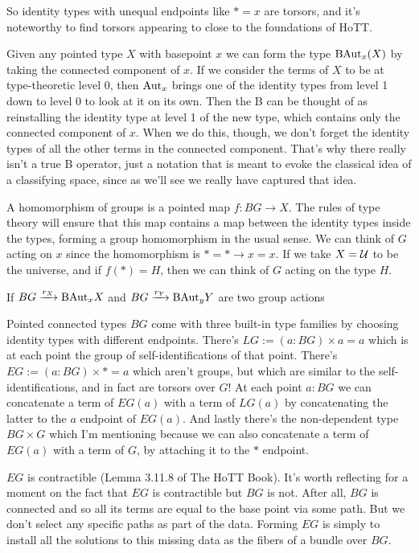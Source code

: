 \documentclass[12pt]{report}
\begin{document}
So identity types with unequal endpoints like $*=x$ are torsors, and it's noteworthy to find torsors appearing to close to the foundations of HoTT.

Given any pointed type $X$ with basepoint $x$ we can form the type $\mathrm{BAut}_x(X)$ by taking the connected component of $x$. If we consider the terms of $X$ to be at type-theoretic level 0, then $\mathrm{Aut}_x$ brings one of the identity types from level 1 down to level 0 to look at it on its own. Then the B can be thought of as reinstalling the identity type at level 1 of the new type, which contains only the connected component of $x$. When we do this, though, we don't forget the identity types of all the other terms in the connected component. That's why there really isn't a true B operator, just a notation that is meant to evoke the classical idea of a classifying space, since as we'll see we really have captured that idea.

A homomorphism of groups is a pointed map $f:BG\to X$. The rules of type theory will ensure that this map contains a map between the identity types inside the types, forming a group homomorphism in the usual sense. We can think of $G$ acting on $x$ since the homomorphism is $*=*\to x=x$. If we take $X=\mathcal{U}$ to be the universe, and if $f(*)=H$, then we can think of $G$ acting on the type $H$.

If $BG\xrightarrow[]{r_X} \mathrm{BAut}_x X$ and $BG\xrightarrow[]{r_Y} \mathrm{BAut}_y Y$ are two group actions


Pointed connected types $BG$ come with three built-in type families by choosing identity types with different endpoints. There's $LG:=(a:BG)\times a=a$ which is at each point the group of self-identifications of that point. There's $EG:=(a:BG)\times *=a$ which aren't groups, but which are similar to the self-identifications, and in fact are torsors over $G$! At each point $a:BG$ we can concatenate a term of $EG(a)$ with a term of $LG(a)$ by concatenating the latter to the $a$ endpoint of $EG(a)$. And lastly there's the non-dependent type $BG\times G$ which I'm mentioning because we can also concatenate a term of $EG(a)$ with a term of $G$, by attaching it to the $*$ endpoint.

$EG$ is contractible (Lemma 3.11.8 of The HoTT Book\cite{hottbook}). It's worth reflecting for a moment on the fact that $EG$ is contractible but $BG$ is not. After all, $BG$ is connected and so all its terms are equal to the base point via some path. But we don't select any specific paths as part of the data. Forming $EG$ is simply to install all the solutions to this missing data as the fibers of a bundle over $BG$.
\end{document}
